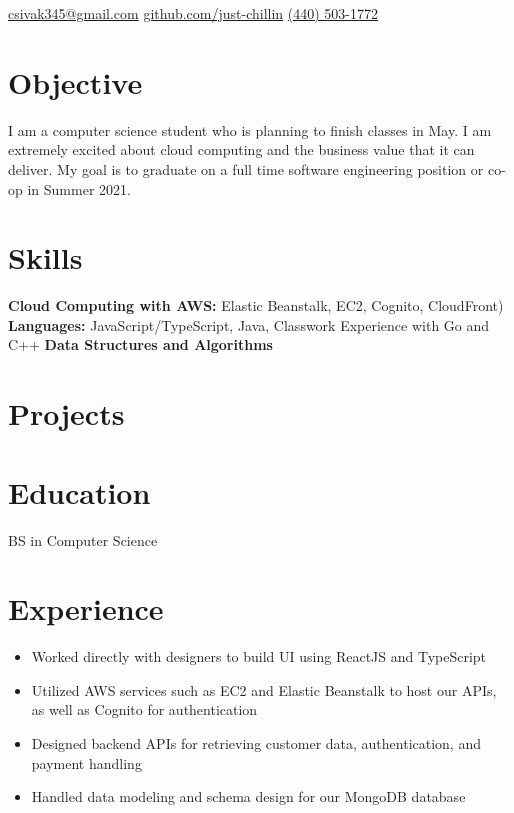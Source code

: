 \documentclass{cv}
\begin{document}
	
	\contact
		{\faEnvelopeSquare\space\href{mailto:csivak345@gmail.com}{csivak345@gmail.com}}
		{\faGithub\space\url{github.com/just-chillin}}
		{\faPhone\space\href{tel:14405031772}{(440) 503-1772}}
	
	\section{Objective}
	\begin{flushleft}
		I am a computer science student who is planning to finish classes in May. I am extremely excited about cloud computing and the business value that it can deliver. My goal is to graduate on a full time software engineering position or co-op in Summer 2021.
	\end{flushleft}

	
	\section{Skills}
	\textbf{Cloud Computing with AWS:} Elastic Beanstalk, EC2, Cognito, CloudFront)\newline
	\textbf{Languages:} JavaScript/TypeScript, Java, Classwork Experience with Go and C++\newline
	\textbf{Data Structures and Algorithms}
	
	\section{Projects}
	

	\section{Education}
	BS in Computer Science

	\section{Experience}
	\begin{itemize}
		\item Worked directly with designers to build UI using ReactJS and TypeScript
		\item Utilized AWS services such as EC2 and Elastic Beanstalk to host our APIs, as well as Cognito for authentication
		\item Designed backend APIs for retrieving customer data, authentication, and payment handling
		\item Handled data modeling and schema design for our MongoDB database
	\end{itemize}
\end{document}
